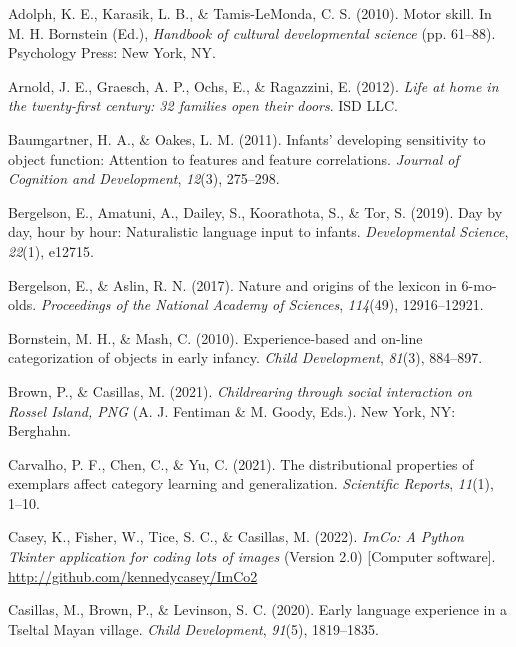 \documentclass[10pt, letterpaper]{article}
\newenvironment{CSLReferences}%
  {}%
  {\par}
\begin{document}
\hypertarget{refs}{}
\begin{CSLReferences}
\leavevmode\hypertarget{ref-adolph2010motor}{}%
Adolph, K. E., Karasik, L. B., \& Tamis-LeMonda, C. S. (2010). Motor
skill. In M. H. Bornstein (Ed.), \emph{Handbook of cultural
developmental science} (pp. 61--88). Psychology Press: New York, NY.

\leavevmode\hypertarget{ref-arnold2012life}{}%
Arnold, J. E., Graesch, A. P., Ochs, E., \& Ragazzini, E. (2012).
\emph{Life at home in the twenty-first century: 32 families open their
doors}. ISD LLC.

\leavevmode\hypertarget{ref-baumgartner2011infants}{}%
Baumgartner, H. A., \& Oakes, L. M. (2011). Infants' developing
sensitivity to object function: Attention to features and feature
correlations. \emph{Journal of Cognition and Development}, \emph{12}(3),
275--298.

\leavevmode\hypertarget{ref-bergelson2019day}{}%
Bergelson, E., Amatuni, A., Dailey, S., Koorathota, S., \& Tor, S.
(2019). Day by day, hour by hour: Naturalistic language input to
infants. \emph{Developmental Science}, \emph{22}(1), e12715.

\leavevmode\hypertarget{ref-bergelson2017nature}{}%
Bergelson, E., \& Aslin, R. N. (2017). Nature and origins of the lexicon
in 6-mo-olds. \emph{Proceedings of the National Academy of Sciences},
\emph{114}(49), 12916--12921.

\leavevmode\hypertarget{ref-bornstein2010experience}{}%
Bornstein, M. H., \& Mash, C. (2010). Experience-based and on-line
categorization of objects in early infancy. \emph{Child Development},
\emph{81}(3), 884--897.

\leavevmode\hypertarget{ref-brownIPchildrearing}{}%
Brown, P., \& Casillas, M. (2021). \emph{Childrearing through social
interaction on {Rossel Island, PNG}} (A. J. Fentiman \& M. Goody, Eds.).
New York, NY: Berghahn.

\leavevmode\hypertarget{ref-carvalho2021distributional}{}%
Carvalho, P. F., Chen, C., \& Yu, C. (2021). The distributional
properties of exemplars affect category learning and generalization.
\emph{Scientific Reports}, \emph{11}(1), 1--10.

\leavevmode\hypertarget{ref-casey2022imco}{}%
Casey, K., Fisher, W., Tice, S. C., \& Casillas, M. (2022). \emph{ImCo:
A {Python Tkinter} application for coding lots of images} (Version 2.0)
{[}Computer software{]}. \url{http://github.com/kennedycasey/ImCo2}

\leavevmode\hypertarget{ref-casillas2020early}{}%
Casillas, M., Brown, P., \& Levinson, S. C. (2020). Early language
experience in a {Tseltal Mayan} village. \emph{Child Development},
\emph{91}(5), 1819--1835.


\end{CSLReferences}
\end{document}
